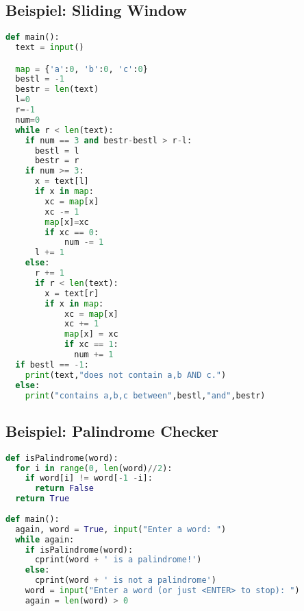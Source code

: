 \subsection{Beispiel: Sliding Window}
\begin{lstlisting}[language=Python]
def main():
  text = input()

  map = {'a':0, 'b':0, 'c':0}
  bestl = -1
  bestr = len(text)
  l=0
  r=-1
  num=0
  while r < len(text):
    if num == 3 and bestr-bestl > r-l:
      bestl = l
      bestr = r
    if num >= 3:
      x = text[l]
      if x in map:
        xc = map[x]
        xc -= 1
        map[x]=xc
        if xc == 0:
            num -= 1
      l += 1
    else:
      r += 1
      if r < len(text):
        x = text[r]
        if x in map:
            xc = map[x]
            xc += 1
            map[x] = xc
            if xc == 1:
              num += 1
  if bestl == -1:
    print(text,"does not contain a,b AND c.")
  else:
    print("contains a,b,c between",bestl,"and",bestr)
\end{lstlisting}

\subsection{Beispiel: Palindrome Checker}
\begin{lstlisting}[language=Python]
def isPalindrome(word):
  for i in range(0, len(word)//2):
    if word[i] != word[-1 -i]:
      return False
  return True
    
def main():
  again, word = True, input("Enter a word: ")
  while again:
    if isPalindrome(word):
      cprint(word + ' is a palindrome!')
    else:
      cprint(word + ' is not a palindrome')
    word = input("Enter a word (or just <ENTER> to stop): ")
    again = len(word) > 0
\end{lstlisting}\vspace{-6px}
